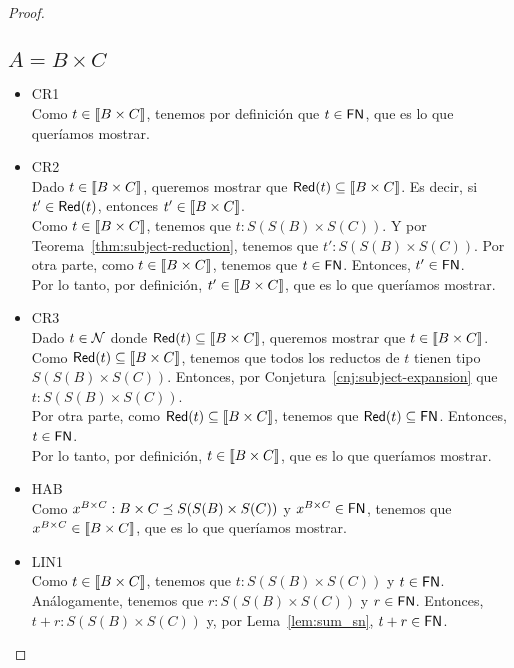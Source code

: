 \begin{proof}
  \subsection*{\( A = B \times C \)}
    \begin{itemize}
      \item CR1
        \\ Como \( t \in \llbracket B \times C\rrbracket \), tenemos por definición que \( t \in \mathsf{FN} \), que es lo que queríamos mostrar.
      \item CR2
        \\ Dado \( t \in \llbracket B \times C\rrbracket \), queremos mostrar que \( \mathsf{Red} (t) \subseteq \llbracket B \times C\rrbracket \). Es decir, si \( t' \in \mathsf{Red} (t) \), entonces \( t' \in \llbracket B \times C\rrbracket \).
        \\ Como \( t \in \llbracket B \times C\rrbracket \), tenemos que \( t : S(S(B) \times S(C)) \). Y por Teorema~\ref{thm:subject-reduction}, tenemos que \( t' : S(S(B) \times S(C)) \). Por otra parte, como \( t \in \llbracket B \times C\rrbracket \), tenemos que \( t \in \mathsf{FN} \). Entonces, \( t' \in \mathsf{FN} \).
        \\ Por lo tanto, por definición, \( t' \in \llbracket B \times C\rrbracket \), que es lo que queríamos mostrar.
      \item CR3
        \\ Dado \( t \in \mathcal{N} \) donde \( \mathsf{Red} (t) \subseteq \llbracket B \times C\rrbracket \), queremos mostrar que \( t \in \llbracket B \times C\rrbracket \).
        \\ Como \( \mathsf{Red} (t) \subseteq \llbracket B \times C\rrbracket \), tenemos que todos los reductos de \( t \) tienen tipo \( S(S(B) \times S(C)) \). Entonces, por Conjetura~\ref{cnj:subject-expansion} que \( t : S(S(B) \times S(C)) \).
        \\ Por otra parte, como \( \mathsf{Red} (t) \subseteq \llbracket B \times C\rrbracket \), tenemos que \( \mathsf{Red} (t) \subseteq \mathsf{FN} \). Entonces, \( t \in \mathsf{FN} \).
        \\ Por lo tanto, por definición, \( t \in \llbracket B \times C\rrbracket \), que es lo que queríamos mostrar.
      \item HAB
        \\ Como \( x^{B \times C} : B \times C \preceq S(S(B) \times S(C)) \) y \( x^{B \times C} \in \mathsf{FN} \), tenemos que \( x^{B \times C} \in \llbracket B \times C\rrbracket \), que es lo que queríamos mostrar.
      \item LIN1
        \\ Como \( t \in \llbracket B \times C\rrbracket \), tenemos que \( t : S(S(B) \times S(C)) \) y \( t \in \mathsf{FN} \). Análogamente, tenemos que \( r : S(S(B) \times S(C)) \) y \( r \in \mathsf{FN} \). Entonces, \( t + r : S(S(B) \times S(C)) \) y, por Lema~\ref{lem:sum_sn}, \( t + r \in \mathsf{FN} \).

\end{itemize}
\end{proof}
